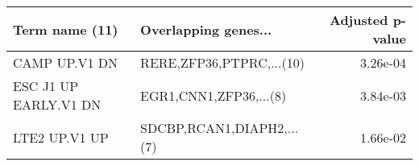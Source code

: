\begin{tabular}{llr}
\toprule
       Term name (11) &      Overlapping genes... &  Adjusted p-value \\
\midrule
        CAMP UP.V1 DN &  RERE,ZFP36,PTPRC,...(10) &          3.26e-04 \\
ESC J1 UP EARLY.V1 DN &    EGR1,CNN1,ZFP36,...(8) &          3.84e-03 \\
        LTE2 UP.V1 UP & SDCBP,RCAN1,DIAPH2,...(7) &          1.66e-02 \\
\bottomrule
\end{tabular}
